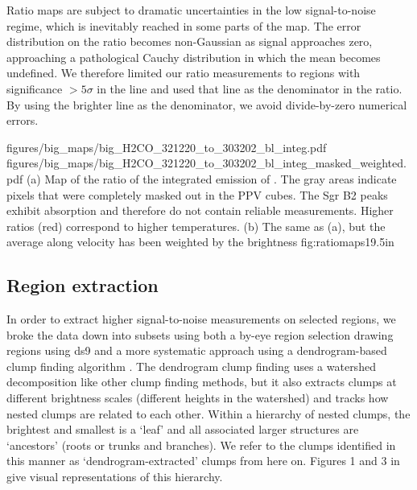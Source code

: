 
Ratio maps are subject to dramatic uncertainties in the low signal-to-noise
regime, which is inevitably reached in some parts of the map.  The error
distribution on the ratio becomes non-Gaussian as signal approaches zero,
approaching a pathological Cauchy distribution in which the mean becomes
undefined.
We therefore limited our ratio measurements to regions with significance
$>5\sigma$ in the \threeohthree line and used that line as the denominator
in the ratio.  By using the brighter line as the denominator, we avoid
divide-by-zero numerical errors.


\RotFigureTwoAA
{figures/big_maps/big_H2CO_321220_to_303202_bl_integ.pdf}
{figures/big_maps/big_H2CO_321220_to_303202_bl_integ_masked_weighted.pdf}
{(a) Map of the ratio of the integrated emission of
\Rone.  The gray areas indicate pixels that were completely masked out in the
PPV cubes.  The Sgr B2 peaks exhibit \formaldehyde absorption and therefore do
not contain reliable measurements.  Higher ratios
(red) correspond
to higher temperatures.
\newline
(b) The same as (a), but the average along velocity has been
weighted by the \threeohthree brightness
\newline
}
{fig:ratiomaps}{1}{9.5in}



\subsection{Region extraction}
\label{sec:region}
In order to extract higher signal-to-noise measurements on selected regions, we
broke the data down into subsets using both a by-eye region selection drawing
regions using ds9 and a more systematic approach using a dendrogram-based clump
finding algorithm \citep[][\url{http://dendrograms.org/}]{Rosolowsky2008c}.
The dendrogram clump finding uses a watershed decomposition like other clump
finding methods, but it also extracts clumps at different brightness scales
(different heights in the watershed) and tracks how nested clumps are related
to each other.  Within a hierarchy of nested clumps, the brightest and smallest
is a `leaf' and all associated larger structures are `ancestors' (roots or
trunks and branches).  We refer to the clumps identified in this manner as
`dendrogram-extracted' clumps from here on.
Figures 1 and 3 in \citet{Rosolowsky2008c} give visual representations of this
hierarchy.

